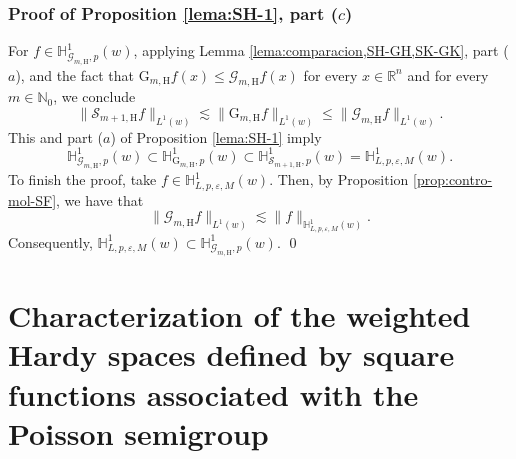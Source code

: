 \documentclass[11pt, a4paper,leqno]{amsart}
\theoremstyle{plain}
\theoremstyle{definition}
\theoremstyle{remark}
\numberwithin{equation}{section}
\def \R{ \mathbb{R} }
\def \N{ \mathbb{N} }
\def \Scal{ \mathcal{S} }
\def \hh{ \mathrm{H} }
\def \Gcal { \mathcal{G} }
\def \Grm{ \mathrm{G} }
\begin{document}
\subsubsection{Proof of Proposition \ref{lema:SH-1}, part ($c$)}
For  $f \in \mathbb{H}_{\Gcal_{m,\hh},p}^1(w)$, applying Lemma \ref{lema:comparacion,SH-GH,SK-GK}, part ($a$), and the fact that $\Grm_{m,\hh}f(x)\leq \Gcal_{m,\hh}f(x)$ for every $x\in \R^n$ and for every $m\in \N_0$, we conclude
$$
\|\Scal_{m+1,\hh}f\|_{L^1(w)}\lesssim 
\|\Grm_{m,\hh}f\|_{L^1(w)}\leq \|\Gcal_{m,\hh}f\|_{L^1(w)}.
$$
This and part ($a$) of Proposition \ref{lema:SH-1} imply
$$
\mathbb{H}_{\Gcal_{m,\hh},p}^1(w)\subset 
\mathbb{H}_{\Grm_{m,\hh},p}^1(w)
\subset
\mathbb{H}_{\Scal_{m+1,\hh},p}^1(w)=\mathbb{H}_{L,p,\varepsilon,M}^1(w).
$$
To finish the proof, take $f\in \mathbb{H}_{L,p,\varepsilon,M}^1(w)$. Then, by Proposition \ref{prop:contro-mol-SF}, we have that
$$
\|\Gcal_{m,\hh}f\|_{L^1(w)}\lesssim \|f\|_{\mathbb{H}_{L,p,\varepsilon,M}^1(w)}.
$$ 
Consequently, $\mathbb{H}_{L,p,\varepsilon,M}^1(w)\subset \mathbb{H}_{\Gcal_{m,\hh},p}^1(w).$ \qed


\bigskip

\section{Characterization of the weighted Hardy spaces defined by  square functions associated with the Poisson semigroup}\label{SKPG}

\end{document}
